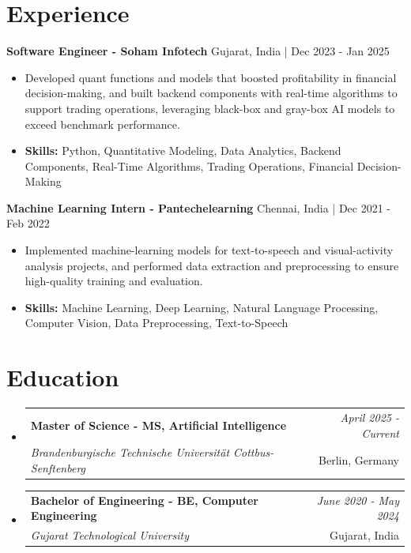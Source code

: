 \documentclass[a4paper,11pt]{article}
\makeatletter
\newcommand{\resumeSubheading}[4]{
\vspace{0.5mm}\item
    \begin{tabular*}{\linewidth}[t]{l@{\extracolsep{\fill}}r}
        \textbf{#1} & \textit{\footnotesize{#4}} \\
        \textit{\footnotesize{#3}} &  \footnotesize{#2}\\
    \end{tabular*}
    \vspace{-2.4mm}
}
\makeatother
\begin{document}
\section{\textbf{Experience}}


\vspace{1mm}
  \textbf{Software Engineer - Soham Infotech} \hfill Gujarat, India | Dec 2023 - Jan 2025
\vspace{-1.5mm} %
\begin{itemize}
  \item Developed quant functions and models that boosted profitability in financial decision-making, and built backend components with real-time algorithms to support trading operations, leveraging black-box and gray-box AI models to exceed benchmark performance.

\vspace{-2mm}
  \item \textbf{Skills:} Python, Quantitative Modeling, Data Analytics, Backend Components, Real-Time Algorithms, Trading Operations, Financial Decision-Making
\end{itemize}

\vspace{1mm}
  \textbf{Machine Learning Intern - Pantechelearning} \hfill Chennai, India | Dec 2021 - Feb 2022
\vspace{-1.5mm} %
\begin{itemize}
  \item Implemented machine-learning models for text-to-speech and visual-activity analysis projects, and performed data extraction and preprocessing to ensure high-quality training and evaluation.
\vspace{-2mm}
  \item \textbf{Skills:} Machine Learning, Deep Learning, Natural Language Processing, Computer Vision, Data Preprocessing, Text-to-Speech
\end{itemize}\section{\textbf{Education}}
\vspace{-0.4mm}

\begin{itemize}[leftmargin=0.15in, label={}]
\resumeSubheading
{Master of Science - MS, Artificial Intelligence }{Berlin, Germany}
{Brandenburgische Technische Universität Cottbus-Senftenberg  }{April 2025 - Current}

\vspace{1.0mm} %
\resumeSubheading
{Bachelor of Engineering - BE, Computer Engineering  }{Gujarat, India}
{Gujarat Technological University }{June 2020 - May 2024}

\end{itemize}
\end{document}

